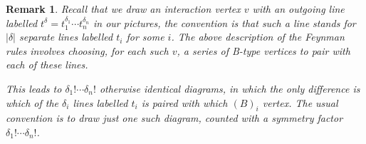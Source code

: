 \documentclass[english,letter paper,12pt,leqno]{article}
\theoremstyle{example}
\newtheorem{remark}[theorem]{Remark}
\numberwithin{equation}{section}
\begin{document}
\begin{remark}\label{remark:boson_symmetry} Recall that we draw an interaction vertex $v$ with an outgoing line labelled $t^\delta = t_1^{\delta_1} \cdots t_n^{\delta_n}$ in our pictures, the convention is that such a line stands for $|\delta|$ separate lines labelled $t_i$ for some $i$. The above description of the Feynman rules involves choosing, for each such $v$, a series of B-type vertices to pair with each of these lines. 

This leads to $\delta_1! \cdots \delta_n!$ otherwise identical diagrams, in which the only difference is \emph{which} of the $\delta_i$ lines labelled $t_i$ is paired with which $(B)_i$ vertex. The usual convention is to draw just one such diagram, counted with a symmetry factor $\delta_1! \cdots \delta_n!$.
\end{remark}
\end{document}
